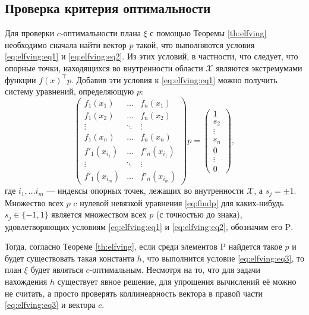 \documentclass[specialist,
               substylefile = spbu.rtx,
               subf,href,colorlinks=true, 12pt]{disser}
\theoremstyle{definition}
\begin{document}
	\subsection{Проверка критерия оптимальности}
	Для проверки $c$-оптимальности плана $\xi$ с помощью Теоремы \ref{th:elfving} необходимо сначала найти вектор $p$  такой, что выполняются условия \eqref{eq:elfving:eq1} и \eqref{eq:elfving:eq2}. Из этих условий, в частности, что следует, что опорные точки, находящихся во внутренности области $\mathcal{X}$ являются экстремумами функции $f(x)^\top p$. Добавив эти условия к \eqref{eq:elfving:eq1} можно получить систему уравнений, определяющую $p$:
	 \begin{equation}
	 \label{eq:findp}
		\begin{pmatrix}
			f_1(x_1) & \dots & f_n(x_1) \\
			f_1(x_2) & \dots & f_n(x_2) \\
  			\vdots &   \ddots & \vdots \\
  			f_1(x_n)  & \dots & f_n(x_n) \\
  			f'_1(x_{i_1}) & \dots & f'_n(x_{i_1}) \\
  			\vdots &   \ddots & \vdots \\
  			f'_1(x_{i_m})  & \dots & f'_n(x_{i_m})
		\end{pmatrix} 
		p =
		\begin{pmatrix}
			1 \\ s_2 \\ \vdots \\ s_n \\ 0 \\ \vdots \\ 0
		\end{pmatrix},
	\end{equation}
	где $i_1, \ldots i_m$ --- индексы опорных точек, лежащих во внутренности $\mathcal{X}$, а $s_j = \pm 1$. Множество всех  $p$ c нулевой невязкой уравнения \eqref{eq:findp} для каких-нибудь $s_j \in \{-1, 1\}$ является множеством всех $p$ (с точностью до знака), удовлетворяющих условиям  \eqref{eq:elfving:eq1} и \eqref{eq:elfving:eq2}, обозначим его $\mathrm{P}$.
	
	Тогда, согласно Теореме \ref{th:elfving}, если среди элементов $\mathrm{P}$ найдется такое $p$ и будет существовать такая константа $h$, что выполнится условие \eqref{eq:elfving:eq3}, то план $\xi$ будет являться $c$-оптимальным. Несмотря на то, что для задачи  нахождения $h$ существует явное решение, для упрощения вычислений её можно не считать, а просто проверять коллинеарность вектора в правой части \eqref{eq:elfving:eq3} и вектора $c$. 
\end{document}
